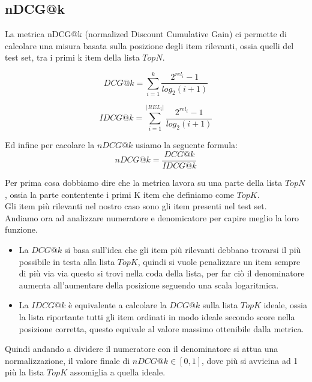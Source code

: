 \subsection{nDCG@k}
La metrica nDCG@k (normalized Discount Cumulative Gain) ci permette di calcolare una misura basata sulla posizione degli item rilevanti, ossia quelli del test set, tra i primi k item della lista $TopN$.

\begin{minipage}[H]{0.5\textwidth}
	$$DCG@k = \sum_{i=1}^{k} \frac{2^{rel_i} - 1}{log_{2} (i + 1)}$$
\end{minipage}
\begin{minipage}[H]{0.5\textwidth}
	$$IDCG@k = \sum_{i=1}^{|REL_i|} \frac{2^{rel_i} - 1}{log_{2} (i + 1)}$$
\end{minipage}
\newline

Ed infine per cacolare la $nDCG@k$ usiamo la seguente formula:
$$nDCG@k = \frac{DCG@k}{IDCG@k}$$

Per prima cosa dobbiamo dire che la metrica lavora su una parte della lista $TopN$, ossia la parte contentente i primi K item che definiamo come $TopK$.\\
Gli item più rilevanti nel nostro caso sono gli item presenti nel test set.\\
Andiamo ora ad analizzare numeratore e denomicatore per capire meglio la loro funzione.
\begin{itemize}
	\item La $DCG@k$ si basa sull'idea che gli item più rilevanti debbano trovarsi il più possibile in testa alla lista $TopK$, quindi si vuole penalizzare un item sempre di più via via questo si trovi nella coda della lista, per far ciò il denominatore aumenta all'aumentare della posizione seguendo una scala logaritmica. 
	\item La $IDCG@k$ è equivalente a calcolare la $DCG@k$ sulla lista $TopK$ ideale, ossia la lista riportante tutti gli item ordinati in modo ideale secondo score nella posizione corretta, questo equivale al valore massimo ottenibile dalla metrica. 
\end{itemize}

Quindi andando a dividere il numeratore con il denominatore si attua una normalizzazione, il valore finale di $nDCG@k \in [0,1]$, dove più si avvicina ad 1 più la lista $TopK$ assomiglia a quella ideale.
